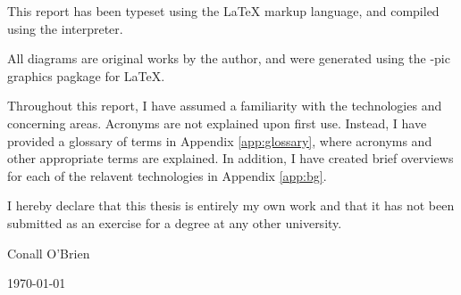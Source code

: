 
This report has been typeset using the \textrm{\LaTeX{}} markup language, 
and compiled using the \textrm{\LaTeXe{}} interpreter. 


All diagrams are original works by the author, and were generated 
using the \textrm{\Xy-pic{}} graphics pagkage for \textrm{\LaTeX{}}.



Throughout this report, I have assumed a familiarity with the
technologies and concerning areas. Acronyms are not explained upon first
use. Instead, I have provided a glossary of terms in Appendix
\ref{app:glossary}, where acronyms and other appropriate terms are
explained. In addition, I have created brief overviews for each 
of the relavent technologies in Appendix \ref{app:bg}.



\vfill


I hereby declare that this thesis is entirely my own work and that it
has not been submitted as an exercise for a degree at any other
university.

\vspace{35mm}

\begin{flushright}

\underline{\hspace*{75mm}}

Conall O'Brien

\today

\end{flushright}
